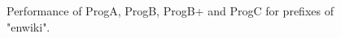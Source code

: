 \documentclass[10pt,journal,compsoc]{IEEEtran}
\begin{document}
\begin{figure}[htbp!]
	\centering
	\hfil
	\hfil
	\caption{Performance of ProgA, ProgB, ProgB+ and ProgC for prefixes of "enwiki".}
	\label{fig:performance_analysis2}
\end{figure}
	
\end{document}
